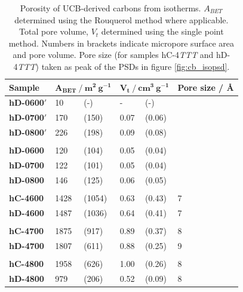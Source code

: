 \begin{table}[ht!]
    \centering
    \caption{Porosity of UCB-derived carbons from  isotherms. $A_{BET}$ determined using the Rouquerol method where applicable. Total pore volume, $V_t$ determined using the single point method. Numbers in brackets indicate micropore surface area and pore volume. Pore size (for samples hC-4\textit{TTT} and hD-4\textit{TTT}) taken as peak of the PSDs in figure \ref{fig:cb_isopsd}.}
    \label{tb:cb_porosity}
    \begin{tabularx}{0.9\textwidth}{lllllll}
    \toprule
        \textbf{Sample} & \multicolumn{2}{l}{$\mathbf{A_{BET}\ /\ m^2\ g^{-1}}$}  & \multicolumn{2}{l}{$\mathbf{V_t\ /\ cm^3\ g^{-1}}$} & \multicolumn{2}{l}{\textbf{Pore size / \AA}} \\
    \midrule
        \textbf{hD-0600$'$} & 10 & (-) & - & (-) & \\
        \textbf{hD-0700$'$} & 170 & (150) & 0.07 & (0.06) \\
        \textbf{hD-0800$'$} & 226 & (198) & 0.09 & (0.08) \\
        & & & \\
        \textbf{hD-0600} & 120 & (104) & 0.05 & (0.04) & \\
        \textbf{hD-0700} & 122 &  (101) & 0.05 & (0.04) & \\
        \textbf{hD-0800} & 146 & (125) & 0.06 & (0.05) \\
        & & & \\
        \textbf{hC-4600} & 1428 & (1054) & 0.63 & (0.43) & 7  \\
        \textbf{hD-4600} & 1487 & (1036) & 0.64 & (0.41) & 7 \\
        & & & \\
        \textbf{hC-4700} & 1875 & (917) & 0.89 & (0.37) & 8 \\
        \textbf{hD-4700} & 1807 & (611) & 0.88 & (0.25) & 9  \\
        & & & \\
        \textbf{hC-4800} & 1958 & (626) & 1.00 & (0.26) & 8 \\
        \textbf{hD-4800} & 979 & (206) & 0.52 & (0.09) &  8 \\
    \bottomrule
    \end{tabularx}
\end{table}

